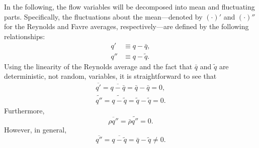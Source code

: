 In the following, the flow variables will be decomposed into mean and
fluctuating parts.  Specifically, the fluctuations about the
mean---denoted by $(\cdot)'$ and $(\cdot)''$ for the Reynolds and
Favre averages, respectively---are defined by the following
relationships:
%
\begin{align*}
q' &\equiv q - \bar{q}, \\
q'' &\equiv q - \tilde{q}.
\end{align*}
%
Using the linearity of the Reynolds average and the fact that
$\bar{q}$ and $\tilde{q}$ are deterministic, not random, variables, it
is straightforward to see that
%
\begin{gather*}
\overline{q'} = \overline{q - \bar{q}} = \bar{q} - \bar{q} =  0, \\
\widetilde{q''} = \widetilde{q - \tilde{q}} = \tilde{q} - \tilde{q} = 0.
\end{gather*}
%
Furthermore,
%
\begin{equation*}
\overline{\rho q''} = \bar{\rho} \widetilde{q''} = 0.
\end{equation*}
%
However, in general,
%
\begin{equation*}
\overline{q''} = \overline{q - \tilde{q}} = \bar{q} - \tilde{q} \neq 0.
\end{equation*}
%

